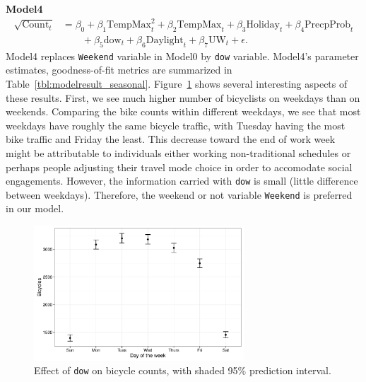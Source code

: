 \documentclass [11pt, proquest] {uwthesis}[2015/03/03]
\begin{document}
\textbf{Model4}
\begin{align}
\sqrt{\text{Count}_t} &= \beta_0 + \beta_1 \text{TempMax}^2_t + \beta_2 \text{TempMax}_t + \beta_3 \text{Holiday}_t + \beta_4 \text{PrecpProb}_t \nonumber\\
&\qquad + \beta_5 \text{dow}_t  + \beta_6 \text{Daylight}_t + \beta_7 \text{UW}_t + \epsilon.\label{eqref:model4}
\end{align}
Model4 replaces \texttt{Weekend} variable in Model0 by \texttt{dow} variable. Model4's parameter estimates, goodness-of-fit metrics are summarized in Table~\ref{tbl:modelresult_seasonal}. Figure~\ref{fig:dow} shows several interesting aspects of these results. First, we see much higher number of bicyclists on weekdays than on weekends. Comparing the bike counts within different weekdays, we see that most weekdays have roughly the same bicycle traffic, with Tuesday having the most bike traffic and Friday the least. This decrease toward the end of work week might be attributable to individuals either working non-traditional schedules or perhaps people adjusting their travel mode choice in order to accomodate social engagements. However, the information carried with \texttt{dow} is small (little difference between weekdays). Therefore, the weekend or not variable \texttt{Weekend} is preferred in our model.

\begin{figure}
\centering
   \includegraphics[width=0.7\textwidth]{figures/sim/dow} 
  \caption{Effect of \texttt{dow} on bicycle counts, with shaded 95\% prediction interval.}
  \label{fig:dow}
\end{figure}
\end{document}
